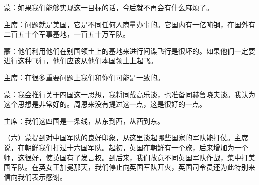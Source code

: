 蒙：如果我们能够实现这一目标的话，今后就不再会有什么麻烦了。

主席：问题就是美国，它是不同任何人商量办事的。它国内有一亿吨钢，在国外有二百五十个军事基地，一百五十万军队。

蒙：他们利用他们在别国领土上的基地来进行间谍飞行是很坏的。如果他们一定要进行这种飞行，他们应该从他们本国领土上起飞。

主席：在很多重要问题上我们和你们可能是一致的。

蒙：我会推行关于四国这一思想，我将同戴高乐谈，也准备同赫鲁晓夫谈。我认为这个思想是非常好的。周恩来没有提过这一点，这是很好的一点。

主席：我们这四国是一条线，从东到西，从西到东。

（六）蒙提到对中国军队的良好印象，从这里谈起哪些国家的军队能打仗。主席说，在朝鲜我们打过十六国军队。起初，英国在朝鲜有一个旅，后来增加为一个师，这很好，使英国有了发言权。到后来，我们故意不同英国军队作战，集中打美国军队。在英女王加冕那天，我们停止向英国军队开火，英国司令员还为此特别来信向我们表示感谢。

